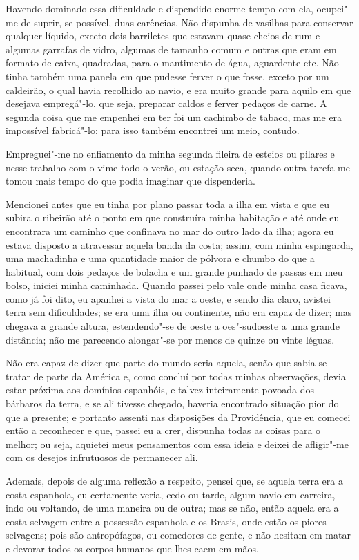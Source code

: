 Havendo dominado essa dificuldade e dispendido enorme tempo com ela,
ocupei"-me de suprir, se possível, duas carências. Não dispunha de
vasilhas para conservar qualquer líquido, exceto dois barriletes que
estavam quase cheios de rum e algumas garrafas de vidro, algumas de
tamanho comum e outras que eram em formato de caixa, quadradas, para o
mantimento de água, aguardente etc. Não tinha também uma panela em que
pudesse ferver o que fosse, exceto por um caldeirão, o qual havia
recolhido ao navio, e era muito grande para aquilo em que desejava
empregá"-lo, que seja, preparar caldos e ferver pedaços de carne. A
segunda coisa que me empenhei em ter foi um cachimbo de tabaco, mas me
era impossível fabricá"-lo; para isso também encontrei um meio, contudo.

Empreguei"-me no enfiamento da minha segunda fileira de esteios ou
pilares e nesse trabalho com o vime todo o verão, ou estação seca,
quando outra tarefa me tomou mais tempo do que podia imaginar que
dispenderia.

Mencionei antes que eu tinha por plano passar toda a ilha em vista e que
eu subira o ribeirão até o ponto em que construíra minha habitação e até
onde eu encontrara um caminho que confinava no mar do outro lado da
ilha; agora eu estava disposto a atravessar aquela banda da costa;
assim, com minha espingarda, uma machadinha e uma quantidade maior de
pólvora e chumbo do que a habitual, com dois pedaços de bolacha e um
grande punhado de passas em meu bolso, iniciei minha caminhada. Quando
passei pelo vale onde minha casa ficava, como já foi dito, eu apanhei a
vista do mar a oeste, e sendo dia claro, avistei terra sem dificuldades;
se era uma ilha ou continente, não era capaz de dizer; mas chegava a
grande altura, estendendo"-se de oeste a oes"-sudoeste a uma grande
distância; não me parecendo alongar"-se por menos de quinze ou vinte
léguas.

Não era capaz de dizer que parte do mundo seria aquela, senão que sabia
se tratar de parte da América e, como concluí por todas minhas
observações, devia estar próxima aos domínios espanhóis, e talvez
inteiramente povoada dos bárbaros da terra, e se ali tivesse chegado,
haveria encontrado situação pior do que a presente; e portanto assenti
nas disposições da Providência, que eu comecei então a reconhecer e que,
passei eu a crer, dispunha todas as coisas para o melhor; ou seja,
aquietei meus pensamentos com essa ideia e deixei de afligir"-me com os
desejos infrutuosos de permanecer ali.

Ademais, depois de alguma reflexão a respeito, pensei que, se aquela
terra era a costa espanhola, eu certamente veria, cedo ou tarde, algum
navio em carreira, indo ou voltando, de uma maneira ou de outra; mas se
não, então aquela era a costa selvagem entre a possessão espanhola e os
Brasis, onde estão os piores selvagens; pois são antropófagos, ou
comedores de gente, e não hesitam em matar e devorar todos os corpos
humanos que lhes caem em mãos.

